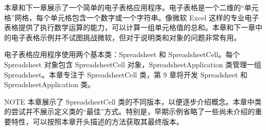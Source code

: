 本章和下一章展示了一个简单的电子表格应用程序。电子表格是一个二维的“单元格”网格，每个单元格包含一个数字或一个字符串。像微软 Excel 这样的专业电子表格提供了执行数学运算的能力，可以计算一组单元格值的总和。本章和下一章中的电子表格示例并不试图挑战微软，但对于说明类和对象的问题非常有用。

电子表格应用程序使用两个基本类：Spreadsheet 和 SpreadsheetCell。每个 Spreadsheet 对象包含 SpreadsheetCell 对象，SpreadsheetApplication 类管理一组 Spreadsheet。本章专注于 SpreadsheetCell 类，第 9 章将开发 Spreadsheet 和 SpreadsheetApplication 类。

\begin{myNotic}{NOTE}
本章展示了 SpreadsheetCell 类的不同版本，以便逐步介绍概念。本章中类的尝试并不展示定义类的“最佳”方式。特别是，早期示例省略了一些尚未介绍的重要特性，可以按照本章开头描述的方法获取其最终版本。
\end{myNotic}











